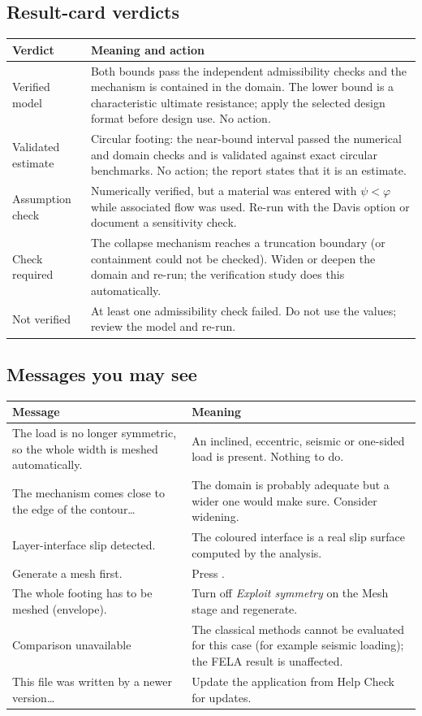 \documentclass[11pt,a4paper]{article}
\newcommand{\menu}[1]{\textsf{#1}}
\newcommand{\key}[1]{\fboxsep=2pt\fbox{\footnotesize\textsf{#1}}}
\newcommand{\field}[1]{\textsf{\textit{#1}}}
\begin{document}
\subsection*{Result-card verdicts}
\begin{longtable}{L{34mm}L{120mm}}
\toprule
\textbf{Verdict} & \textbf{Meaning and action}\\
\midrule
\endhead
Verified model & Both bounds pass the independent admissibility checks and the mechanism is contained in the domain. The lower bound is a characteristic ultimate resistance; apply the selected design format before design use. No action.\\
Validated estimate & Circular footing: the near-bound interval passed the numerical and domain checks and is validated against exact circular benchmarks. No action; the report states that it is an estimate.\\
Assumption check & Numerically verified, but a material was entered with $\psi < \varphi$ while associated flow was used. Re-run with the Davis option or document a sensitivity check.\\
Check required & The collapse mechanism reaches a truncation boundary (or containment could not be checked). Widen or deepen the domain and re-run; the verification study does this automatically.\\
Not verified & At least one admissibility check failed. Do not use the values; review the model and re-run.\\
\bottomrule
\end{longtable}

\subsection*{Messages you may see}
\begin{longtable}{L{62mm}L{92mm}}
\toprule
\textbf{Message} & \textbf{Meaning}\\
\midrule
\endhead
The load is no longer symmetric, so the whole width is meshed automatically. & An inclined, eccentric, seismic or one-sided load is present. Nothing to do.\\
The mechanism comes close to the edge of the contour\ldots & The domain is probably adequate but a wider one would make sure. Consider widening.\\
Layer-interface slip detected. & The coloured interface is a real slip surface computed by the analysis.\\
Generate a mesh first. & Press \key{F9}.\\
The whole footing has to be meshed (envelope). & Turn off \field{Exploit symmetry} on the Mesh stage and regenerate.\\
Comparison unavailable & The classical methods cannot be evaluated for this case (for example seismic loading); the FELA result is unaffected.\\
This file was written by a newer version\ldots & Update the application from \menu{Help \textbar{} Check for updates}.\\
\bottomrule
\end{longtable}
\end{document}
